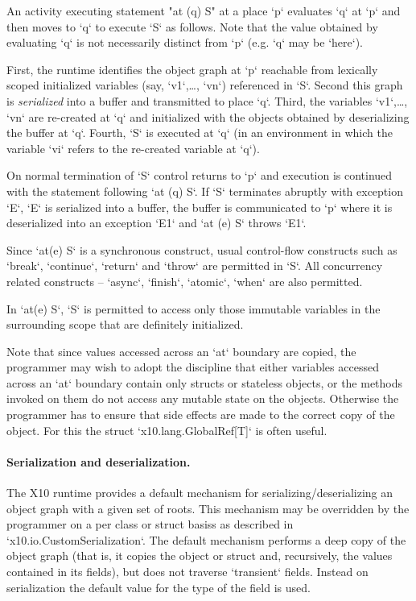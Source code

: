 An activity executing statement \xcd"at (q) S" at a place \xcd`p`
evaluates \xcd`q` at \xcd`p` and then moves to \xcd`q` to execute
\xcd`S` as follows. Note that the value obtained by evaluating \xcd`q`
is not necessarily distinct from \xcd`p` (e.g.{} \xcd`q` may be
\xcd`here`).

First, the runtime identifies the object graph at \xcd`p` reachable
from lexically scoped initialized variables (say, \xcd`v1`,\ldots,
\xcd`vn`) referenced in \xcd`S`.  Second this graph is {\em
  serialized} into a buffer and transmitted to place \xcd`q`.  Third,
the variables \xcd`v1`,\ldots, \xcd`vn` are re-created at \xcd`q` and
initialized with the objects obtained by deserializing the buffer at
\xcd`q`. Fourth, \xcd`S` is executed at \xcd`q` (in an environment in
which the variable \xcd`vi` refers to the re-created variable at
\xcd`q`).

On normal termination of \xcd`S` control returns to \xcd`p` and
execution is continued with the statement following \xcd`at (q) S`. If
\xcd`S` terminates abruptly with exception \xcd`E`, \xcd`E` is
serialized into a buffer, the buffer is communicated to \xcd`p` where
it is deserialized into an exception \xcd`E1` and \xcd`at (e) S`
throws \xcd`E1`.

Since \xcd`at(e) S` is a synchronous construct, usual control-flow
constructs such as \xcd`break`, \xcd`continue`, \xcd`return` and 
\xcd`throw` are permitted in \xcd`S`.  All concurrency related
constructs -- \xcd`async`, \xcd`finish`, \xcd`atomic`, \xcd`when` are
also permitted.

\limitationx{} In \xcd`at(e) S`, \xcd`S` is permitted to access only
those immutable variables in the surrounding scope that are definitely
initialized.

Note that since values accessed across an \xcd`at` boundary are
copied, the programmer may wish to adopt the discipline that either
variables accessed across an \xcd`at` boundary  contain only structs 
or stateless objects, or the methods invoked on them do not access any
mutable state on the objects. Otherwise the programmer has to ensure
that side effects are made to the correct copy of the object. For this
the struct \xcd`x10.lang.GlobalRef[T]` is often useful.

\paragraph{Serialization and deserialization.}
The X10 runtime provides a default mechanism for
serializing/deserializing an object graph with a given set of roots.
This mechanism may be overridden by the programmer on a per class or
struct basiss as described in \xcd`x10.io.CustomSerialization`. 
The default mechanism performs a
deep copy of the object graph (that is, it copies the object or struct
and, recursively, the values contained in its fields), but does not
traverse \xcd`transient` fields. Instead on serialization the default
value  for the type of the field is used.

